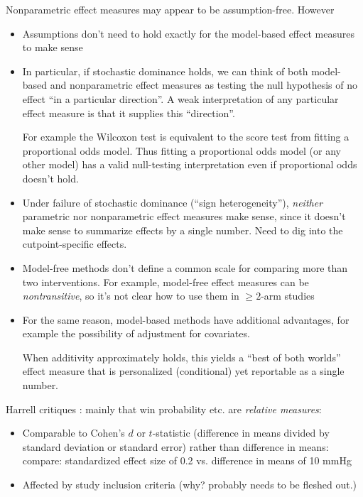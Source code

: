 \documentclass[
  11pt,
  fleqn
]{article}
\begin{document}
Nonparametric effect measures may appear to be assumption-free. However

\begin{itemize}
  \item Assumptions don't need to hold exactly for the model-based
    effect measures to make sense
  \item In particular, if stochastic dominance holds, we can think of
    both model-based and nonparametric effect measures as
    testing the null hypothesis of no effect ``in a particular
    direction''. A weak interpretation of any particular
    effect measure
    is that it supplies this ``direction''.

    For example the Wilcoxon test is
    equivalent to the score test from fitting a proportional odds model.
    Thus fitting a proportional odds model (or any other model) has a
    valid null-testing
    interpretation even if proportional odds doesn't hold.
  \item Under failure of stochastic dominance (``sign
    heterogeneity''), \emph{neither} parametric nor nonparametric
    effect measures make sense, since it doesn't make sense to
    summarize effects by a single number. Need to dig into the
    cutpoint-specific effects.
  \item Model-free methods don't define a common scale for comparing
    more than two interventions. For example, model-free effect
    measures can be \emph{nontransitive}, so it's not clear how to
    use them in $\geq 2$-arm studies
  \item For the same reason, model-based methods have additional
    advantages, for example
    the possibility of adjustment for covariates.

    When additivity approximately holds, this yields a ``best of both
    worlds'' effect measure that is
    personalized (conditional) yet reportable as a single
    number.
\end{itemize}

Harrell critiques \citep{harrellOverviewCompositeOutcome2024,
harrellRareDegenerativeDiseases2024, harrellViewsCompositeOutcome}:
mainly that
win probability etc. are \emph{relative measures}:

\begin{itemize}
  \item Comparable to Cohen's $d$ or $t$-statistic (difference in
    means divided by standard deviation or standard error) rather than
    difference in means: compare: standardized effect size of 0.2 vs.
    difference in means of 10 mmHg
  \item Affected by study inclusion criteria (why? probably needs to
    be fleshed out.)
\end{itemize}
\end{document}
